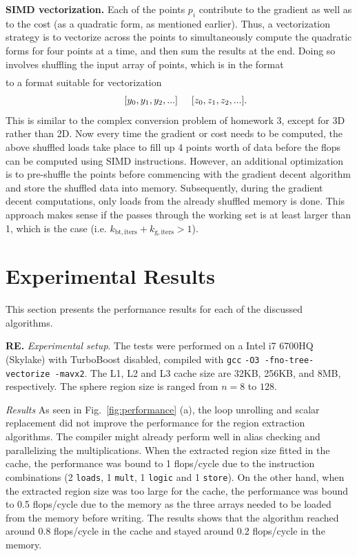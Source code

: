 \documentclass[letterpaper]{article}
\newcommand{\mypar}[1]{{\bf #1.}}
\begin{document}
\mypar{SIMD vectorization}
Each of the points $p_i$ contribute to the gradient as well as to the cost (as a quadratic form, as mentioned earlier). Thus, a vectorization strategy is to vectorize across the points to simultaneously compute the quadratic forms for four points at a time, and then sum the results at the end. Doing so involves shuffling the input array of points, which is in the format 
\begin{align*}
  [x_0, y_0, z_0, x_1, y_1, z_1, x_2, y_2, ...]
\end{align*}
to a format suitable for vectorization
\begin{align*}
  [x_0, x_1, x_2, ...] \hspace{5mm} [y_0, y_1, y_2, ...] \hspace{5mm} [z_0, z_1, z_2, ...].
\end{align*}
This is similar to the complex conversion problem of homework 3, except for 3D rather than 2D. Now every time the gradient or cost needs to be computed, the above shuffled loads take place to fill up 4 points worth of data before the flops can be computed using SIMD instructions. However, an additional optimization is to pre-shuffle the points before commencing with the gradient decent algorithm and store the shuffled data into memory. Subsequently, during the gradient decent computations, only loads from the already shuffled memory is done. This approach makes sense if the passes through the working set is at least larger than 1, which is the case (i.e. $k_\mathrm{bt,iters}+k_\mathrm{g,iters} > 1$). 

\section{Experimental Results}\label{sec:exp}
This section presents the performance results for each of the discussed algorithms.

\mypar{RE} \textit{Experimental setup}. 
The tests were performed on a Intel i7 6700HQ (Skylake) with TurboBoost disabled, compiled with \texttt{gcc} \texttt{-O3 -fno-tree-vectorize -mavx2}. The L1, L2 and L3 cache size are 32KB, 256KB, and 8MB, respectively. The sphere region size is ranged from $n=8$ to $128$.

\textit{Results} As seen in Fig.~\ref{fig:performance} (a), the loop unrolling and scalar replacement did not improve the performance for the region extraction algorithms. The compiler might already perform well in alias checking and parallelizing the multiplications. When the extracted region size fitted in the cache, the performance was bound to 1 flops/cycle due to the instruction combinations (2 {\tt loads}, 1 {\tt mult}, 1 {\tt logic} and 1 {\tt store}). On the other hand, when the extracted region size was too large for the cache, the performance was bound to 0.5 flops/cycle due to the memory as the three arrays needed to be loaded from the memory before writing. The results shows that the algorithm reached around 0.8 flops/cycle in the cache and stayed around 0.2 flops/cycle in the memory.   
\end{document}

